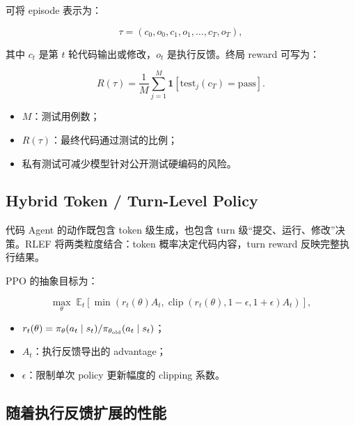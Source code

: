 \documentclass[a4paper]{article}
\begin{document}

可将 episode 表示为：

$$
\tau=(c_0,o_0,c_1,o_1,\ldots,c_T,o_T),
$$

其中 $c_t$ 是第 $t$ 轮代码输出或修改，$o_t$ 是执行反馈。终局 reward 可写为：

$$
R(\tau)=\frac{1}{M}\sum_{j=1}^{M}\mathbf 1[\mathrm{test}_j(c_T)=\mathrm{pass}].
$$

\begin{itemize}
    \item $M$：测试用例数；
    \item $R(\tau)$：最终代码通过测试的比例；
    \item 私有测试可减少模型针对公开测试硬编码的风险。
\end{itemize}

\subsection{Hybrid Token / Turn-Level Policy}

代码 Agent 的动作既包含 token 级生成，也包含 turn 级“提交、运行、修改”决策。RLEF 将两类粒度结合：token 概率决定代码内容，turn reward 反映完整执行结果。


PPO 的抽象目标为：

$$
\max_\theta\;\mathbb E_t\left[
\min\left(r_t(\theta)A_t,
\operatorname{clip}(r_t(\theta),1-\epsilon,1+\epsilon)A_t\right)
\right],
$$

\begin{itemize}
    \item $r_t(\theta)=\pi_\theta(a_t\mid s_t)/\pi_{\theta_{\rm old}}(a_t\mid s_t)$；
    \item $A_t$：执行反馈导出的 advantage；
    \item $\epsilon$：限制单次 policy 更新幅度的 clipping 系数。
\end{itemize}

\subsection{随着执行反馈扩展的性能}

\end{document}

